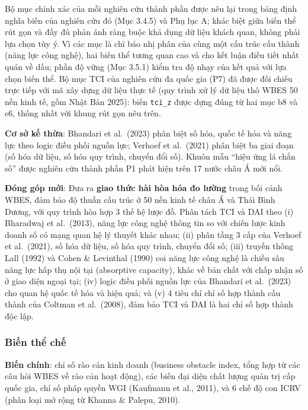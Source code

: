 \documentclass[
  a4paper,
  13pt]{extreport}
\begin{document}
Bộ mục chính xác của mỗi nghiên cứu thành phần được nêu lại trong bảng
định nghĩa biến của nghiên cứu đó (Mục 3.4.5) và Phụ lục A; khác biệt
giữa biến thể rút gọn và đầy đủ phản ánh ràng buộc khả dụng dữ liệu
khách quan, không phải lựa chọn tùy ý. Vì các mục là chỉ báo nhị phân
của cùng một cấu trúc cấu thành (năng lực công nghệ), hai biến thể tương
quan cao và cho kết luận điều tiết nhất quán về dấu; phần độ vững (Mục
3.5.1) kiểm tra độ nhạy của kết quả với lựa chọn biến thể. Bộ mục TCI
của nghiên cứu đa quốc gia (P7) đã được đối chiếu trực tiếp với mã xây
dựng dữ liệu thực tế (quy trình xử lý dữ liệu thô WBES 50 nền kinh tế,
gồm Nhật Bản 2025): biến \texttt{tci\_z} được dựng đúng từ hai mục b8 và
e6, thống nhất với khung rút gọn nêu trên.

\textbf{Cơ sở kế thừa}: Bhandari et al.~(2023) phân biệt số hóa, quốc tế
hóa và năng lực theo logic điều phối nguồn lực; Verhoef et al.~(2021)
phân biệt ba giai đoạn (số hóa dữ liệu, số hóa quy trình, chuyển đổi
số). Khuôn mẫu ``hiệu ứng lá chắn số'' được nghiên cứu thành phần P1
phát hiện trên 17 nước châu Á mới nổi.

\textbf{Đóng góp mới}: Đưa ra \textbf{giao thức hài hòa hóa đo lường}
trong bối cảnh WBES, đảm bảo độ thuần cấu trúc ở 50 nền kinh tế châu Á
và Thái Bình Dương, với quy trình hòa hợp 3 thế hệ lược đồ. Phân tách
TCI và DAI theo (i) Bharadwaj et al.~(2013), năng lực công nghệ thông
tin so với chiến lược kinh doanh số có mạng quan hệ lý thuyết khác nhau;
(ii) phân tầng 3 cấp của Verhoef et al.~(2021), số hóa dữ liệu, số hóa
quy trình, chuyển đổi số; (iii) truyền thống Lall (1992) và Cohen \&
Levinthal (1990) coi năng lực công nghệ là chiều sâu năng lực hấp thụ
nội tại (absorptive capacity), khác về bản chất với chấp nhận số ở giao
diện ngoại tại; (iv) logic điều phối nguồn lực của Bhandari et
al.~(2023) cho quan hệ quốc tế hóa và hiệu quả; và (v) 4 tiêu chí chỉ số
hợp thành cấu thành của Coltman et al.~(2008), đảm bảo TCI và DAI là hai
chỉ số hợp thành độc lập.

\hypertarget{biux1ebfn-thux1ec3-chux1ebf}{%
\subsubsection{Biến thể chế}\label{biux1ebfn-thux1ec3-chux1ebf}}

\textbf{Biến chính}: chỉ số rào cản kinh doanh (business obstacle index,
tổng hợp từ các câu hỏi WBES về rào cản hoạt động), các biến đại diện
chất lượng quản trị cấp quốc gia, chỉ số pháp quyền WGI (Kaufmann et
al., 2011), và 6 chế độ con ICRV (phân loại mở rộng từ Khanna \& Palepu,
2010).
\end{document}
